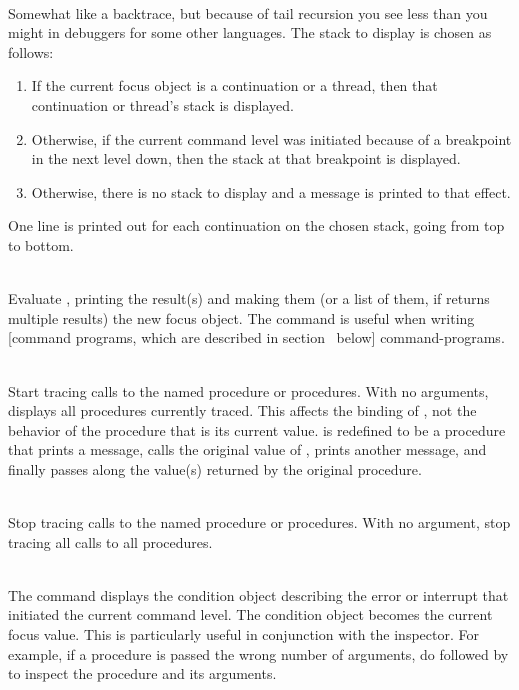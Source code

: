 \begin{description}
\item {}\\
    Somewhat like a backtrace, but because of tail recursion you see
    less than you might in debuggers for some other languages.
    The stack to display is chosen as follows:
\begin{enumerate}
    \item If the current focus object is a continuation or a thread,
       then that continuation or thread's stack is displayed.
    \item Otherwise, if the current command level was initiated because of
       a breakpoint in the next level down, then the stack at that
       breakpoint is displayed.
    \item Otherwise, there is no stack to display and a message is printed
       to that effect.
\end{enumerate}
    One line is printed out for each continuation on the chosen stack,
    going from top to bottom.

\item {}\\
    Evaluate , printing the result(s) and making them
    (or a list of them, if  returns multiple results)
    the new focus object.
    The  command is useful when writing
    [command programs, which are described in section~\Ref{} below]
    {command-programs}.

\item {}\\
    Start tracing calls to the named procedure or procedures.
    With no arguments, displays all procedures currently traced.
    This affects the binding of , not the behavior of the
    procedure that is its current value.   is redefined
    to be a procedure that prints a message,
    calls the original value of , prints another
    message, and finally passes along the value(s) returned by the
    original procedure.

\item {}\\
    Stop tracing calls to the named procedure or procedures.
    With no argument, stop tracing all calls to all procedures.

\item {}\\
    The  command displays the condition object
    describing the error or interrupt that initiated the current
    command level.  The condition object becomes the current focus
    value.  This is particularly useful in conjunction with
    the inspector.  For example, if a procedure is passed the wrong number of
    arguments, do  followed by
      to inspect the
    procedure and its arguments.


\end{description}
